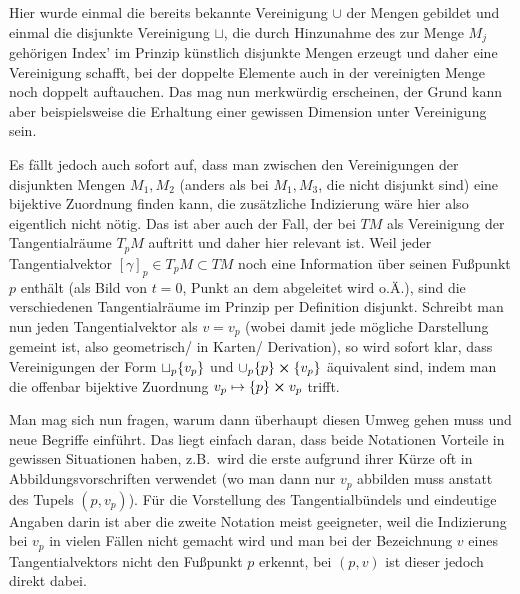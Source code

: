 \documentclass[../H_Analysis_main.tex]{subfiles}
\begin{document}
Hier wurde einmal die bereits bekannte Vereinigung $\cup$ der Mengen gebildet und einmal die disjunkte Vereinigung $\sqcup$, die durch Hinzunahme des zur Menge $M_j$ gehörigen Index' im Prinzip künstlich disjunkte Mengen erzeugt und daher eine Vereinigung schafft, bei der doppelte Elemente auch in der vereinigten Menge noch doppelt auftauchen. Das mag nun merkwürdig erscheinen, der Grund kann aber beispielsweise die Erhaltung einer gewissen Dimension unter Vereinigung sein.

Es fällt jedoch auch sofort auf, dass man zwischen den Vereinigungen der disjunkten Mengen $M_1, M_2$ (anders als bei $M_1, M_3$, die nicht disjunkt sind) eine bijektive Zuordnung finden kann, die zusätzliche Indizierung wäre hier also eigentlich nicht nötig. Das ist aber auch der Fall, der bei $TM$ als Vereinigung der Tangentialräume $T_p M$ auftritt und daher hier relevant ist. Weil jeder Tangentialvektor $[\gamma]_p \in T_p M \subset TM$ noch eine Information über seinen Fußpunkt $p$ enthält (als Bild von $t = 0$, Punkt an dem abgeleitet wird o.Ä.), sind die verschiedenen Tangentialräume im Prinzip per Definition disjunkt. Schreibt man nun jeden Tangentialvektor als $v = v_p$ (wobei damit jede mögliche Darstellung gemeint ist, also geometrisch/ in Karten/ Derivation), so wird sofort klar, dass Vereinigungen der Form $\sqcup_p \qty{v_p}$ und $\cup_p \qty{p} \cross \qty{v_p}$ äquivalent sind, indem man die offenbar bijektive Zuordnung $v_p \mapsto \qty{p} \cross v_p$ trifft.


Man mag sich nun fragen, warum dann überhaupt diesen Umweg gehen muss und neue Begriffe einführt. Das liegt einfach daran, dass beide Notationen Vorteile in gewissen Situationen haben, z.B.~wird die erste aufgrund ihrer Kürze oft in Abbildungsvorschriften verwendet (wo man dann nur $v_p$ abbilden muss anstatt des Tupels $(p, v_p)$). Für die Vorstellung des Tangentialbündels und eindeutige Angaben darin ist aber die zweite Notation meist geeigneter, weil die Indizierung bei $v_p$ in vielen Fällen nicht gemacht wird und man bei der Bezeichnung $v$ eines Tangentialvektors nicht den Fußpunkt $p$ erkennt, bei $(p, v)$ ist dieser jedoch direkt dabei.\\
\end{document}
